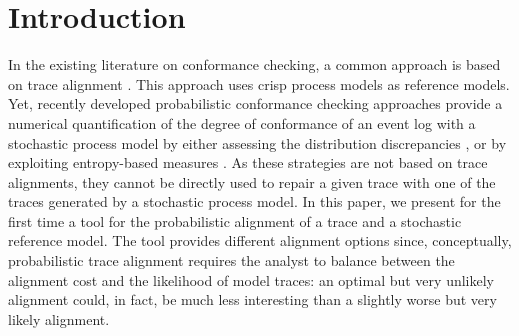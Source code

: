 
\section{Introduction}
\label{introduction}
%
In the existing literature on conformance checking, a common approach is based on trace alignment \cite{DBLP:conf/edoc/AdriansyahDA11}. This approach uses crisp process models as reference models. Yet, recently developed probabilistic conformance checking approaches provide a numerical quantification of the degree of conformance
of an event log with a stochastic process model by either assessing the distribution discrepancies \cite{DBLP:conf/bpm/LeemansSA19}, or by exploiting entropy-based measures \cite{DBLP:conf/icpm/PolyvyanyyK19,DBLP:journals/tosem/PolyvyanyySWCM20}.
As these strategies are not based on trace alignments, they cannot be directly used to repair a given trace with one of the traces generated by a stochastic process model.
%
In this paper, we present for the first time a tool for the probabilistic alignment of a trace and a stochastic reference
model. %
The tool provides different alignment options since, conceptually, probabilistic trace alignment requires the analyst to
balance between the alignment cost and the likelihood of model traces: an optimal but very unlikely alignment could, in fact, be much less interesting than a slightly worse but very likely alignment.

